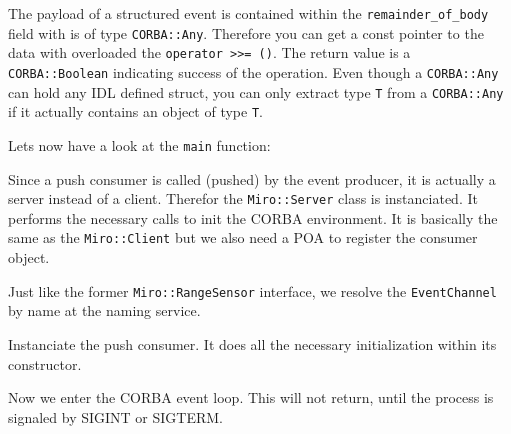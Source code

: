 

The payload of a structured event is contained within the
\lstinline!remainder_of_body! field with is of type
\lstinline!CORBA::Any!.  Therefore you can get a const pointer to the
data with overloaded the \lstinline!operator >>= ()!. The return value
is a \lstinline!CORBA::Boolean! indicating success of the operation.
Even though a \lstinline!CORBA::Any! can hold any IDL defined struct,
you can only extract type \lstinline!T! from a \lstinline!CORBA::Any!
if it actually contains an object of type \lstinline!T!.


\label{lst:SonarNotify2}

Lets now have a look at the \lstinline!main! function:



Since a push consumer is called (pushed) by the event producer, it
is actually a server instead of a client. Therefor the
\lstinline!Miro::Server!  class is instanciated. It performs the
necessary calls to init the CORBA environment. It is basically the
same as the \lstinline!Miro::Client!  but we also need a POA to
register the consumer object.



Just like the former \lstinline!Miro::RangeSensor! interface, we
resolve the \lstinline!EventChannel! by name at the naming service.



Instanciate the push consumer. It does all the necessary
initialization within its constructor.



Now we enter the CORBA event loop. This will not return, until the
process is signaled by SIGINT or SIGTERM.

